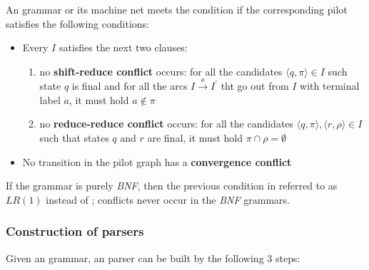 \documentclass[english]{article}
\begin{document}
\bigskip
An \EBNF grammar or its machine net meets the condition \textbf{\ELRo} if the corresponding pilot satisfies the following conditions:

\begin{itemize}
  \item Every \mstate \(I\) satisfies the next two clauses:
        \begin{enumerate}
          \item no \textbf{shift-reduce conflict} occurs: for all the candidates \(\langle q, \pi \rangle \in I\) such state \(q\) is final and for all the arcs \(I \xrightarrow{a} I^\prime\) tht go out from \(I\) with terminal label \(a\), it must hold \(a \notin \pi\)
          \item no \textbf{reduce-reduce conflict} occurs: for all the candidates \(\langle q, \pi \rangle, \langle r, \rho \rangle \in I\) such that states \(q\) and \(r\) are final, it must hold \(\pi \cap \rho = \emptyset\)
        \end{enumerate}
  \item No transition in the pilot graph has a \textbf{convergence conflict}
\end{itemize}

If the grammar is purely \textit{BNF}, then the previous condition in referred to as \(\textit{LR}(1)\) instead of \ELRo;
conflicts never occur in the \textit{BNF} grammars.

\subsubsection[Construction of ELR(1) parser]{Construction of \ELRo parsers}

Given an \EBNF grammar, an \ELRo parser can be built by the following \(3\) steps:
\end{document}
